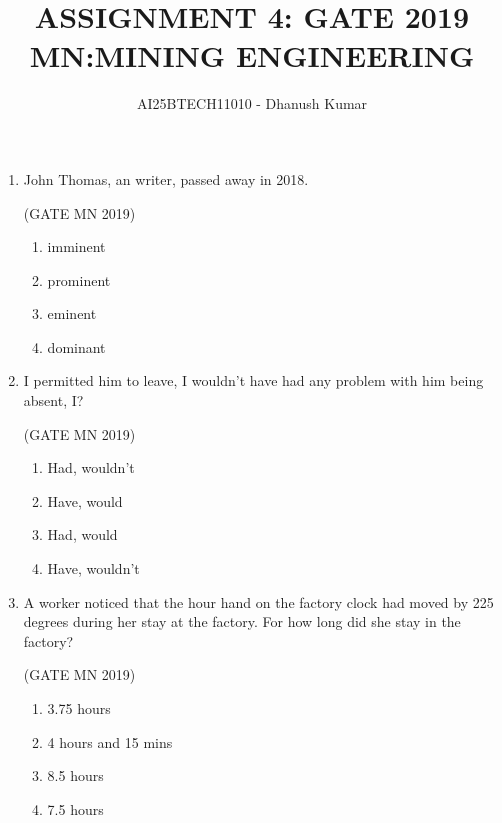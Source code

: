 \documentclass[journal]{IEEEtran}
\begin{document}
\title{
ASSIGNMENT 4: GATE 2019 \\
MN:MINING ENGINEERING}
\author{AI25BTECH11010 - Dhanush Kumar}
\maketitle
\renewcommand{\thefigure}{\theenumi}
\renewcommand{\thetable}{\theenumi}


\begin{enumerate}

\item John Thomas, an  \underline{\hspace{2cm}} writer, passed away in 2018.

	\hfill(GATE MN 2019)
\begin{multicols}{2}
\begin{enumerate}
\item imminent  
\item prominent  
\item eminent  
\item dominant  
\end{enumerate}
\end{multicols}


\item  \underline{\hspace{2cm}} I permitted him to leave, I wouldn’t have had any problem with him being absent,  \underline{\hspace{2cm}} I?

\hfill(GATE MN 2019)
\begin{multicols}{2}
\begin{enumerate}
\item Had, wouldn’t  
\item Have, would  
\item Had, would  
\item Have, wouldn’t  
\end{enumerate}
\end{multicols}

\item A worker noticed that the hour hand on the factory clock had moved by 225 degrees during her stay at the factory. For how long did she stay in the factory?

	\hfill(GATE MN 2019)
\begin{multicols}{2}
\begin{enumerate}
\item 3.75 hours  
\item 4 hours and 15 mins  
\item 8.5 hours  
\item 7.5 hours  
\end{enumerate}
\end{multicols}



\end{enumerate}
\end{document}

